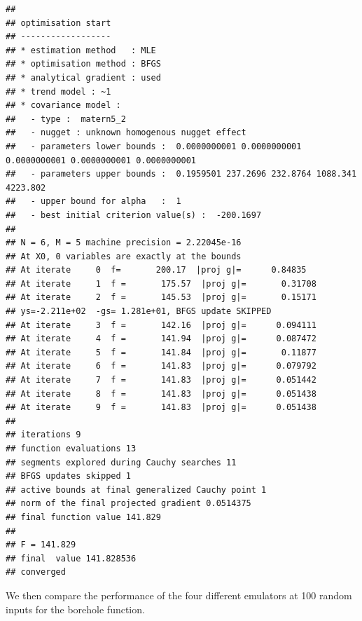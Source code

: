 \documentclass[
  10pt,
]{article}
\begin{document}
\begin{verbatim}
## 
## optimisation start
## ------------------
## * estimation method   : MLE 
## * optimisation method : BFGS 
## * analytical gradient : used
## * trend model : ~1
## * covariance model : 
##   - type :  matern5_2 
##   - nugget : unknown homogenous nugget effect 
##   - parameters lower bounds :  0.0000000001 0.0000000001 0.0000000001 0.0000000001 0.0000000001 
##   - parameters upper bounds :  0.1959501 237.2696 232.8764 1088.341 4223.802 
##   - upper bound for alpha   :  1 
##   - best initial criterion value(s) :  -200.1697 
## 
## N = 6, M = 5 machine precision = 2.22045e-16
## At X0, 0 variables are exactly at the bounds
## At iterate     0  f=       200.17  |proj g|=      0.84835
## At iterate     1  f =       175.57  |proj g|=       0.31708
## At iterate     2  f =       145.53  |proj g|=       0.15171
## ys=-2.211e+02  -gs= 1.281e+01, BFGS update SKIPPED
## At iterate     3  f =       142.16  |proj g|=      0.094111
## At iterate     4  f =       141.94  |proj g|=      0.087472
## At iterate     5  f =       141.84  |proj g|=       0.11877
## At iterate     6  f =       141.83  |proj g|=      0.079792
## At iterate     7  f =       141.83  |proj g|=      0.051442
## At iterate     8  f =       141.83  |proj g|=      0.051438
## At iterate     9  f =       141.83  |proj g|=      0.051438
## 
## iterations 9
## function evaluations 13
## segments explored during Cauchy searches 11
## BFGS updates skipped 1
## active bounds at final generalized Cauchy point 1
## norm of the final projected gradient 0.0514375
## final function value 141.829
## 
## F = 141.829
## final  value 141.828536 
## converged
\end{verbatim}

We then compare the performance of the four different emulators at 100
random inputs for the borehole function.
\end{document}
